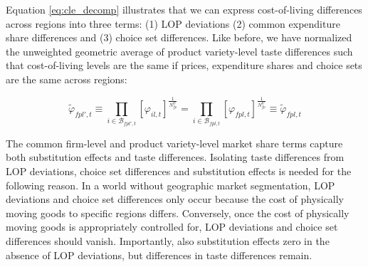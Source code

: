 \noindent Equation \ref{eq:cle_decomp} illustrates that we can express cost-of-living differences across regions into three terms: (1) LOP deviations (2) common expenditure share differences and (3) choice set differences. Like before, we have normalized the unweighted geometric average of product variety-level taste differences such that cost-of-living levels are the same if prices, expenditure shares and choice sets are the same across regions: 
\begin{linenomath*}
    \begin{equation*}
        \tilde{\varphi}_{fpl',t} \equiv 
            \prod_{i \in \mathcal{B}_{fpl',t}} \left[\varphi_{il,t} \right]^{\frac{1}{N^{ll'}_{fp}}} 
        = 
            \prod_{i \in \mathcal{B}_{fpl,t}} \left[\varphi_{fpl,t} \right]^{\frac{1}{N^{ll'}_{fp}}}
        \equiv  \tilde{\varphi}_{fpl,t} 
    \end{equation*}
\end{linenomath*}

The common firm-level and product variety-level market share terms capture both substitution effects and taste differences. Isolating taste differences from LOP deviations, choice set differences and substitution effects is needed for the following reason. In a world without geographic market segmentation, LOP deviations and choice set differences only occur because the cost of physically moving goods to specific regions differs. Conversely, once the cost of physically moving goods is appropriately controlled for, LOP deviations and choice set differences should vanish. Importantly, also substitution effects zero in the absence of LOP deviations, but differences in taste differences remain. 

